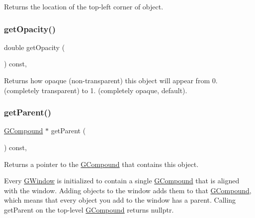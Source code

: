 Returns the location of the top-\/left corner of object. 

\mbox{\label{classGObject_a1ae3fc278cc5b71b9f2d96a8a83cdf26}} 
\subsubsection{\texorpdfstring{get\+Opacity()}{getOpacity()}}
{\footnotesize\ttfamily double get\+Opacity (\begin{DoxyParamCaption}{ }\end{DoxyParamCaption}) const\hspace{0.3cm}{\ttfamily [virtual]}, {\ttfamily [inherited]}}



Returns how opaque (non-\/transparent) this object will appear from 0. (completely transparent) to 1. (completely opaque, default). 

\mbox{\label{classGObject_a3e53cef70541b1a14eade4ad0984d0b4}} 
\subsubsection{\texorpdfstring{get\+Parent()}{getParent()}}
{\footnotesize\ttfamily \mbox{\hyperlink{classGCompound}{G\+Compound}} $\ast$ get\+Parent (\begin{DoxyParamCaption}{ }\end{DoxyParamCaption}) const\hspace{0.3cm}{\ttfamily [virtual]}, {\ttfamily [inherited]}}



Returns a pointer to the {\ttfamily \mbox{\hyperlink{classGCompound}{G\+Compound}}} that contains this object. 

Every {\ttfamily \mbox{\hyperlink{classGWindow}{G\+Window}}} is initialized to contain a single {\ttfamily \mbox{\hyperlink{classGCompound}{G\+Compound}}} that is aligned with the window. Adding objects to the window adds them to that {\ttfamily \mbox{\hyperlink{classGCompound}{G\+Compound}}}, which means that every object you add to the window has a parent. Calling {\ttfamily get\+Parent} on the top-\/level {\ttfamily \mbox{\hyperlink{classGCompound}{G\+Compound}}} returns {\ttfamily nullptr}. \mbox{\label{classGObject_a798cc79daaa10145b28f60bcdfdb0ee9}} 
